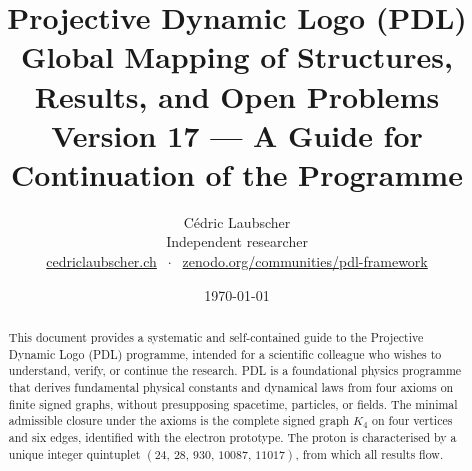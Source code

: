 \documentclass[11pt,a4paper]{article}
\title{Projective Dynamic Logo (PDL)\\[4pt]
\large Global Mapping of Structures, Results, and Open Problems\\[2pt]
\normalsize Version 17 --- A Guide for Continuation of the Programme}
\author{C\'edric Laubscher\\[4pt]
\small Independent researcher\\
\small \href{https://cedriclaubscher.ch}{cedriclaubscher.ch}
$\;\cdot\;$
\small \href{https://zenodo.org/communities/pdl-framework/}{zenodo.org/communities/pdl-framework}}
\date{\today}
\theoremstyle{plain}
\theoremstyle{definition}
\theoremstyle{remark}
\newcommand{\Kfour}{K_4}
\newcommand{\quintuplet}{(24,\,28,\,930,\,10087,\,11017)}
\begin{document}
\maketitle
\setcounter{tocdepth}{2}

\begin{abstract}
This document provides a systematic and self-contained guide to the Projective Dynamic Logo (PDL) programme, intended for a scientific colleague who wishes to understand, verify, or continue the research.
PDL is a foundational physics programme that derives fundamental physical constants and dynamical laws from four axioms on finite signed graphs, without presupposing spacetime, particles, or fields.
The minimal admissible closure under the axioms is the complete signed graph $\Kfour$ on four vertices and six edges, identified with the electron prototype.
The proton is characterised by a unique integer quintuplet $\quintuplet$, from which all results flow.


\end{abstract}
\end{document}
